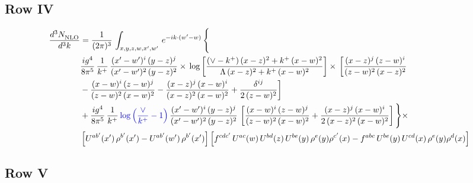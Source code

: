 \documentclass[9pt]{article}
\numberwithin{equation}{section}
\begin{document}
\subsection{Row IV}
\begin{align}
    \frac{d^{3}N_{\rm NLO}^{\rm}}{d^{3}k}  & =  \frac{1}{(2\pi)^{3}}\,
    \int_{x,y,z,w,x',w'}\,e^{-ik\cdot (w^\prime-w)}\,\Bigg\{\notag \\ & \frac{ig^{4}}{8\pi^{5}}\,\frac{1}{k^{+}}\,\frac{(x'-w')^{i}\,(y-z)^{j}}{(x'-w')^{2}\,(y-z)^{2}}\times\,\log{\left[\frac{(\vee-k^{+})\,(x-z)^{2}+k^{+}\,(x-w)^{2}}{\Lambda\, (x-z)^{2} + k^{+}\,(x-w)^{2}}\right]}\times\, \bigg[\frac{(x-z)^{j}\,(z-w)^{i}}{(z-w)^{2}\,(x-z)^{2}}\notag \\ & -\frac{(x-w)^{i}\,(z-w)^{j}}{(z-w)^{2}\,(x-w)^{2}}-\frac{(x-z)^{j}\,(x-w)^{i}}{(x-z)^{2}\,(x-w)^{2}}+\frac{\delta^{ij}}{2\,(z-w)^{2}}\bigg]\notag \\ & + \frac{ig^{4}}{8\pi^{5}}\,\frac{1}{k^{+}}\,{\color{blue}\log{\left(\frac{\vee}{k^{+}}-1\right)}}\,\frac{(x'-w')^{i}\,(y-z)^{j}}{(x'-w')^{2}\,(y-z)^{2}}\,\left[\frac{(x-w)^{i}\,(z-w)^{j}}{(z-w)^{2}\,(x-w)^{2}}+\frac{(x-z)^{j}\,(x-w)^{i}}{2\, (x-z)^{2}\,(x-w)^{2}}\right] \Bigg\}\times\notag \\ &  \left[U^{ab'}(x')\,\rho^{b'}(x')-U^{ab'}(w')\,\rho^{b'}(x')\right] \left[f^{cdc'}\,U^{ac}(w)\,U^{bd}(z)\,U^{be}(y)\,\rho^{e}(y)\rho^{c'}(x)-f^{abc}\,U^{be}(y)\,U^{cd}(x)\,\rho^{e}(y)\rho^{d}(x)\right]
\end{align}
\subsection{Row V}
\end{document}
